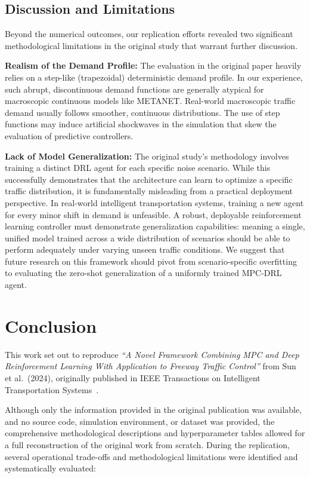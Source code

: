 \subsection{Discussion and Limitations}

Beyond the numerical outcomes, our replication efforts revealed two significant methodological limitations in the original study that warrant further discussion.

\textbf{Realism of the Demand Profile:} The evaluation in the original paper heavily relies on a step-like (trapezoidal) deterministic demand profile. In our experience, such abrupt, discontinuous demand functions are generally atypical for macroscopic continuous models like METANET. Real-world macroscopic traffic demand usually follows smoother, continuous distributions. The use of step functions may induce artificial shockwaves in the simulation that skew the evaluation of predictive controllers.

\textbf{Lack of Model Generalization:} The original study's methodology involves training a distinct DRL agent for each specific noise scenario. While this successfully demonstrates that the architecture can learn to optimize a specific traffic distribution, it is fundamentally misleading from a practical deployment perspective. In real-world intelligent transportation systems, training a new agent for every minor shift in demand is unfeasible. A robust, deployable reinforcement learning controller must demonstrate generalization capabilities: meaning a single, unified model trained across a wide distribution of scenarios should be able to perform adequately under varying unseen traffic conditions. We suggest that future research on this framework should pivot from scenario-specific overfitting to evaluating the zero-shot generalization of a uniformly trained MPC-DRL agent.
\newpage

\section{Conclusion}

This work set out to reproduce \textit{``A Novel Framework Combining MPC and Deep Reinforcement Learning With Application to Freeway Traffic Control''} from Sun et al.\ (2024), originally published in IEEE Transactions on Intelligent Transportation Systems~\cite{sun2024novel}.

Although only the information provided in the original publication was available, and no source code, simulation environment, or dataset was provided, the comprehensive methodological descriptions and hyperparameter tables allowed for a full reconstruction of the original work from scratch. During the replication, several operational trade-offs and methodological limitations were identified and systematically evaluated:

